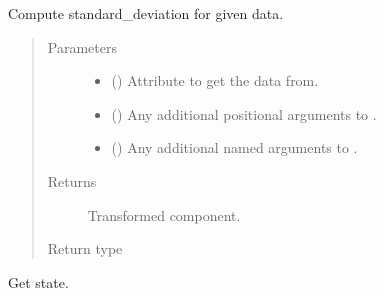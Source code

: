 \documentclass[letterpaper,10pt,english]{sphinxmanual}
\begin{document}
\begin{fulllineitems}
\begin{fulllineitems}
\label{\detokenize{api/states:geology.src.States.standard_deviation}}
Compute standard\_deviation for given data.
\begin{quote}\begin{description}
\item[{Parameters}] \leavevmode\begin{itemize}
\item {} 
 (\sphinxstyleliteralemphasis{\sphinxupquote{, }}) \textendash{} Attribute to get the data from.

\item {} 
 () \textendash{} Any additional positional arguments to .

\item {} 
 () \textendash{} Any additional named arguments to .

\end{itemize}

\item[{Returns}] \leavevmode
{} \textendash{} Transformed component.

\item[{Return type}] \leavevmode
{\hyperref[\detokenize{api/base_classes:geology.src.base_spatial.SpatialComponent}]{}}

\end{description}\end{quote}

\end{fulllineitems}


\begin{fulllineitems}
\label{\detokenize{api/states:geology.src.States.state}}
Get state.


\end{fulllineitems}
\end{fulllineitems}
\end{document}

